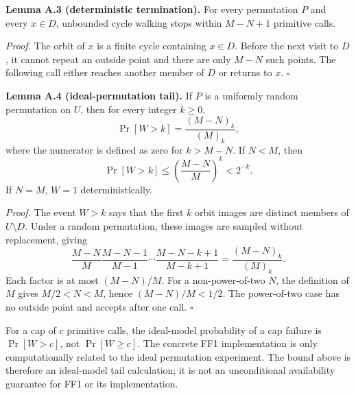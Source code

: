 \textbf{Lemma A.3 (deterministic termination).}
For every permutation $P$ and every $x\in D$, unbounded cycle walking stops
within $M-N+1$ primitive calls.

\textit{Proof.}
The orbit of $x$ is a finite cycle containing $x\in D$.  Before the next visit
to $D$, it cannot repeat an outside point and there are only $M-N$ such points.
The following call either reaches another member of $D$ or returns to $x$.
\hfill$\square$

\textbf{Lemma A.4 (ideal-permutation tail).}
If $P$ is a uniformly random permutation on $U$, then for every integer
$k\geq0$,
\[
\Pr[W>k]=\frac{(M-N)_k}{(M)_k},
\]
where the numerator is defined as zero for $k>M-N$.  If $N<M$, then
\[
\Pr[W>k]
\leq\left(\frac{M-N}{M}\right)^k<2^{-k}.
\]
If $N=M$, $W=1$ deterministically.

\textit{Proof.}
The event $W>k$ says that the first $k$ orbit images are distinct members of
$U\setminus D$.  Under a random permutation, these images are sampled without
replacement, giving
\[
\frac{M-N}{M}\frac{M-N-1}{M-1}\cdots
\frac{M-N-k+1}{M-k+1}=\frac{(M-N)_k}{(M)_k}.
\]
Each factor is at most $(M-N)/M$.  For a non-power-of-two $N$, the definition
of $M$ gives $M/2<N<M$, hence $(M-N)/M<1/2$.  The power-of-two case has no
outside point and accepts after one call. \hfill$\square$

For a cap of $c$ primitive calls, the ideal-model probability of a cap failure
is $\Pr[W>c]$, not $\Pr[W\geq c]$.  The concrete FF1 implementation is only
computationally related to the ideal permutation experiment.  The bound above
is therefore an ideal-model tail calculation; it is not an unconditional
availability guarantee for FF1 or its implementation.
